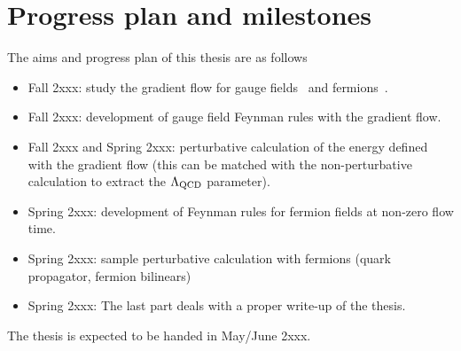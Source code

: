 \documentclass[aps,prc,twocolumn,showpacs,floatfix,nofootinbib,preprintnumbers,superscriptaddress,amsmath,amssymb]{revtex4-1}
\begin{document}
\section*{Progress plan and milestones}
The aims and progress plan of this thesis are as follows
\begin{itemize}
\item Fall 2xxx: study the gradient flow for gauge fields~\cite{Luscher:2010iy} and fermions~\cite{Luscher:2013cpa}.
\item Fall 2xxx: development of gauge field Feynman rules with the gradient flow.
\item Fall 2xxx and Spring 2xxx: perturbative calculation of the energy defined with the gradient flow (this can be matched
with the non-perturbative calculation to extract the $\Lambda_{\rm QCD}$ parameter).
\item Spring 2xxx: development of Feynman rules for fermion fields at non-zero flow time.
\item Spring 2xxx: sample perturbative calculation with fermions (quark propagator, fermion bilinears)
\item Spring 2xxx: The last part deals with a proper write-up of the thesis. 
\end{itemize}
 

The thesis is expected to be handed in May/June 2xxx.


%

\end{document}
